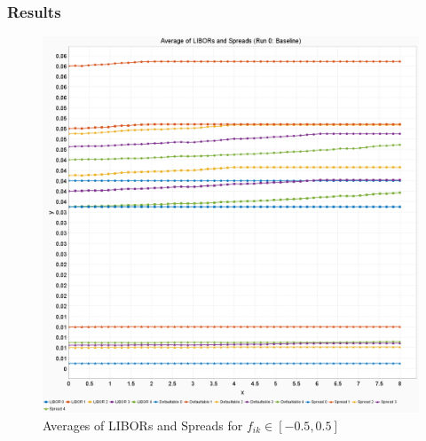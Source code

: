 \documentclass{beamer}
\begin{document}
\begin{frame}
%		
	\end{frame}
	
	\begin{frame}
		\frametitle{Results}
	\begin{figure}
		\centering
		\includegraphics[height=0.6\textheight]{VorstellungPics/FreeParamsRange05}
		\caption[]{Averages of LIBORs and Spreads for $f_{i k} \in [-0.5, 0.5]$}
		\label{fig:freeparamsrange05}
	\end{figure}
	
		
	\end{frame}
	
\end{document}
